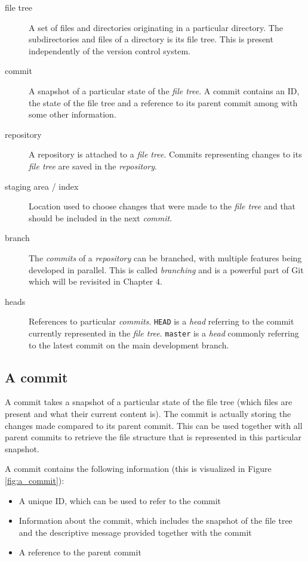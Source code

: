 \documentclass[../main/git_course_main.tex]{subfiles}
\begin{document}
\begin{description}
	\item[file tree] A set of files and directories originating in a particular directory. The subdirectories and files of a directory is its file tree. This is present independently of the version control system.
	\item[commit] A snapshot of a particular state of the \textit{file tree}. A commit contains an ID, the state of the file tree and a reference to its parent commit among with some other information.
	\item[repository] A repository is attached to a \textit{file tree}. Commits representing changes to its \textit{file tree} are saved in the \textit{repository}.
	\item[staging area / index] Location used to choose changes that were made to the \textit{file tree} and that should be included in the next \textit{commit}.
	\item[branch] The \textit{commits} of a \textit{repository} can be branched, with multiple features being developed in parallel. This is called \textit{branching} and is a powerful part of Git which will be revisited in Chapter 4.
	\item[heads] References to particular \textit{commits}. \verb$HEAD$ is a \textit{head} referring to the commit currently represented in the \textit{file tree}. \verb$master$ is a \textit{head} commonly referring to the latest commit on the main development branch.
\end{description}

\subsection{A commit}

A commit takes a snapshot of a particular state of the file tree (which files are present and what their current content is). The commit is actually storing the changes made compared to its parent commit. This can be used together with all parent commits to retrieve the file structure that is represented in this particular snapshot.

A commit contains the following information (this is visualized in Figure \ref{fig:a_commit}):

\begin{itemize}
	\item A unique ID, which can be used to refer to the commit
	\item Information about the commit, which includes the snapshot of the file tree and the descriptive message provided together with the commit
	\item A reference to the parent commit
\end{itemize}
\end{document}
